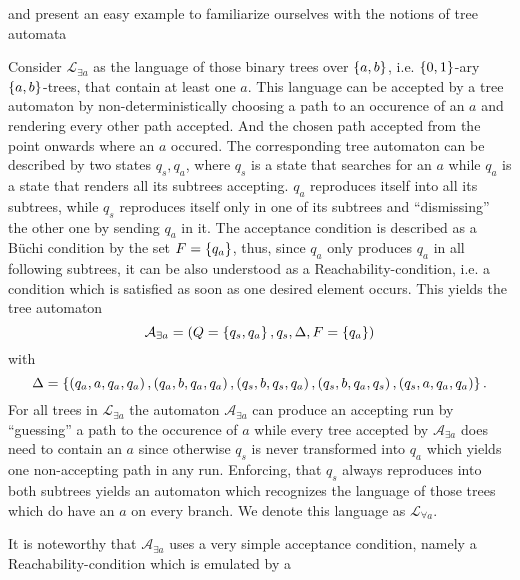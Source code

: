     and present an easy example 
to familiarize ourselves with the notions of tree automata
\begin{example}
  Consider $\mathcal{L}_{\exists a}$ as the language of those binary trees over 
  $\left\{a,b\right\}$, i.e. $\left\{0,1\right\}$-ary $\left\{a,b\right\}$-trees, that contain at least 
  one $a$. This language can be accepted by a tree automaton by 
  non-deterministically choosing a path to an occurence of an $a$ and rendering 
  every other path accepted. And the chosen path accepted from the point 
  onwards where an $a$ occured. The corresponding tree automaton can be 
  described by two states $q_{s}, q_{a}$, where $q_{s}$ is a state that 
  searches for an $a$ while $q_{a}$ is a state that renders all its subtrees 
  accepting. $q_{a}$ reproduces itself into all its subtrees, while $q_{s}$ 
  reproduces itself only in one of its subtrees and \enquote{dismissing} the 
  other one by sending $q_{a}$ in it. The acceptance condition is described as 
  a Büchi condition by the set $F = \left\{q_{a}\right\}$, thus, since $q_{a}$ only 
  produces $q_{a}$ in all following subtrees, it can be also understood as a 
  Reachability-condition, i.e. a condition which is satisfied as soon as one
  desired element occurs. This yields the tree automaton
  \begin{equation*}
    \mathcal{A}_{\exists a} = \left(Q = \left\{q_{s}, q_{a}\right\}, q_{s},
    \Delta ,F = \left\{q_{a}\right\}\right)
  \end{equation*}
  with
  \begin{equation*}
    \Delta = \left\{\left(q_{a}, a, q_{a}, q_{a}\right),\left(q_{a}, b, q_{a}, q_{a}\right),
      \left(q_{s}, b, q_{s}, q_{a}\right), \left(q_{s}, b, q_{a}, q_{s}\right),
      \left(q_{s}, a, q_{a}, q_{a}\right)\right\}.
  \end{equation*}
  For all trees in $\mathcal{L}_{\exists a}$ the automaton
  $\mathcal{A}_{\exists a}$ can produce an accepting run by \enquote{guessing}
  a path to the occurence of $a$ while every tree accepted by
  $\mathcal{A}_{\exists a}$ does need to contain an $a$ since otherwise $q_{s}$
  is never transformed into $q_{a}$ which yields one non-accepting path in any
  run. Enforcing, that $q_{s}$ always reproduces into both subtrees yields an
  automaton which recognizes the language of those trees which do have an $a$
  on every branch. We denote this language as $\mathcal{L}_{\forall a}$.
  \label{ex:treeexa}
\end{example}
It is noteworthy that $\mathcal{A}_{\exists a}$ uses a very simple acceptance
condition, namely a Reachability-condition which is emulated by a 
